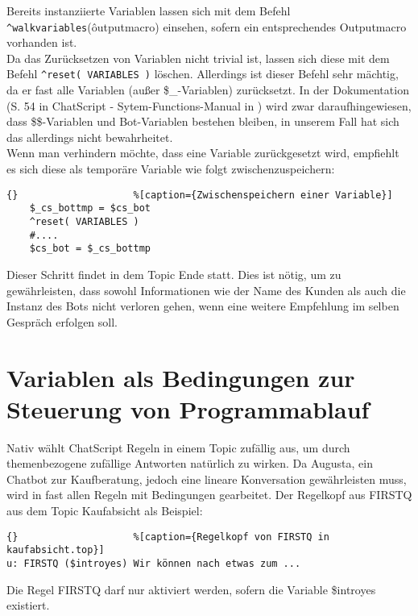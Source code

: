 Bereits instanziierte Variablen lassen sich mit dem Befehl \lstinline|^walkvariables|(\^outputmacro) einsehen, sofern ein entsprechendes Outputmacro vorhanden ist.\\
Da das Zurücksetzen von Variablen nicht trivial ist, lassen sich diese mit dem Befehl \lstinline|^reset( VARIABLES )| löschen. Allerdings ist dieser Befehl sehr mächtig, da er fast alle Variablen (außer \$\_-Variablen) zurücksetzt. In der Dokumentation (S. 54 in ChatScript - Sytem-Functions-Manual in \citet{chatscript2019}) wird zwar daraufhingewiesen, dass \$\$-Variablen und Bot-Variablen bestehen bleiben, in unserem Fall hat sich das allerdings nicht bewahrheitet.\\
Wenn man verhindern möchte, dass eine Variable zurückgesetzt wird, empfiehlt es sich diese als temporäre Variable wie folgt zwischenzuspeichern:

\begin{lstlisting}{}					%[caption={Zwischenspeichern einer Variable}]
	$_cs_bottmp = $cs_bot
    ^reset( VARIABLES )
    #....
	$cs_bot = $_cs_bottmp 
\end{lstlisting}

Dieser Schritt findet in dem Topic Ende statt. Dies ist nötig, um zu gewährleisten, dass sowohl Informationen wie der Name des Kunden als auch die Instanz des Bots nicht verloren gehen, wenn eine weitere Empfehlung im selben Gespräch erfolgen soll.\\


\section{Variablen als Bedingungen zur Steuerung von Programmablauf}
\label{sec:ChatScript: Variablen als Bedingungen zur Steuerung von Programmablauf}

Nativ wählt ChatScript Regeln in einem Topic zufällig aus, um durch themenbezogene zufällige Antworten natürlich zu wirken. Da Augusta, ein Chatbot zur Kaufberatung, jedoch eine lineare Konversation gewährleisten muss, wird in fast allen Regeln mit Bedingungen gearbeitet. Der Regelkopf aus FIRSTQ aus dem Topic Kaufabsicht als Beispiel: 

\begin{lstlisting}{}					%[caption={Regelkopf von FIRSTQ in kaufabsicht.top}]
u: FIRSTQ ($introyes) Wir können nach etwas zum ... 
\end{lstlisting}

Die Regel FIRSTQ darf nur aktiviert werden, sofern die Variable \$introyes existiert. 


